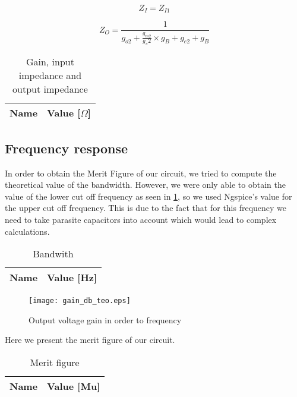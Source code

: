 \begin{equation} \label{eq13}
Z_I=Z_{I1}
\end{equation}

\begin{equation} \label{eq13}
Z_O=\frac{1}{g_{o2}+\frac{g_{m2}}{g_\pi 2}\times g_B+g_{e2}+g_B}
\end{equation}

\begin{table}[h]
  \centering
  \begin{tabular}{|l|r|}
    \hline    
    {\bf Name} & {\bf Value [$\Omega$]} \\ \hline
    
  \end{tabular}
  \caption{Gain, input impedance and output impedance}
  \label{tab:OP}
\end{table}
\FloatBarrier

\subsection{Frequency response}
In order to obtain the Merit Figure of our circuit, we tried to compute the theoretical value of the bandwidth. However, we were only able to obtain the value of the lower cut off frequency as seen in \ref{fig:gain}, so we used Ngspice's value for the upper cut off frequency. This is due to the fact that for this frequency we need to take parasite capacitors into account which would lead to complex calculations.

\begin{table}[h]
  \centering
  \begin{tabular}{|l|r|}
    \hline    
    {\bf Name} & {\bf Value [Hz]} \\ \hline
    
  \end{tabular}
  \caption{Bandwith}
  \label{tab:OP}
\end{table}
\FloatBarrier

\begin{figure}[h] \centering
\texttt{[image: gain\_db\_teo.eps]}
\caption{Output voltage gain in order to frequency}
\label{fig:gain}
\end{figure}
\FloatBarrier

Here we present the merit figure of our circuit.

\begin{table}[h]
  \centering
  \begin{tabular}{|l|r|}
    \hline    
    {\bf Name} & {\bf Value [Mu]} \\ \hline
    
  \end{tabular}
  \caption{Merit figure}
  \label{tab:OP}
\end{table}
\FloatBarrier
